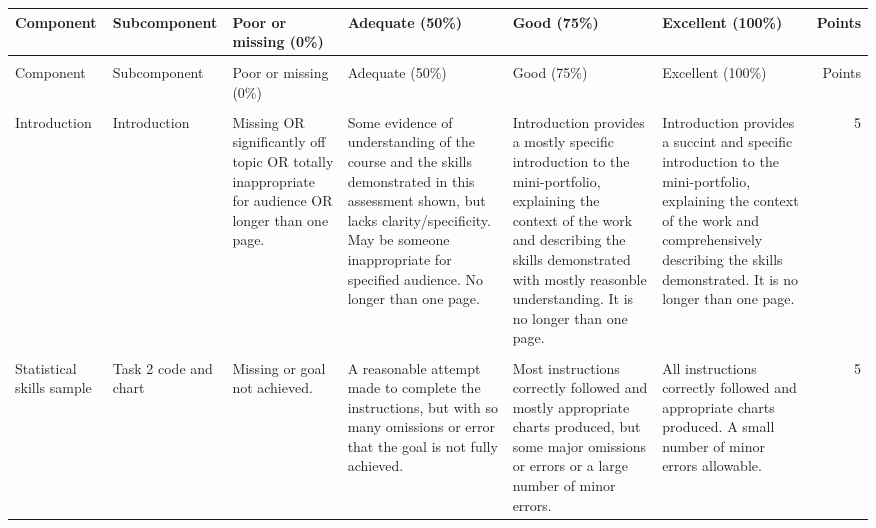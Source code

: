 \documentclass[
  openany]{book}
\begin{document}
\begin{longtable}{>{\raggedright\arraybackslash}p{5em}>{\raggedright\arraybackslash}p{5em}>{\raggedright\arraybackslash}p{10em}>{\raggedright\arraybackslash}p{16em}>{\raggedright\arraybackslash}p{16em}>{\raggedright\arraybackslash}p{16em}r}
\toprule
Component & Subcomponent & Poor or missing (0\%) & Adequate (50\%) & Good (75\%) & Excellent (100\%) & Points\\
\midrule
\endfirsthead
\multicolumn{7}{@{}l}{\textit{(continued)}}\\
\toprule
Component & Subcomponent & Poor or missing (0\%) & Adequate (50\%) & Good (75\%) & Excellent (100\%) & Points\\
\midrule
\endhead

\endfoot
\bottomrule
\endlastfoot
\cellcolor{gray!6}{Cover page} & \cellcolor{gray!6}{Cover page} & \cellcolor{gray!6}{Not all required cover page components are present} & \cellcolor{gray!6}{N/A} & \cellcolor{gray!6}{N/A} & \cellcolor{gray!6}{All required cover page components are present} & \cellcolor{gray!6}{1}\\
Introduction & Introduction & Missing OR significantly off topic OR totally inappropriate for audience OR longer than one page. & Some evidence of understanding of the course and the skills demonstrated in this assessment shown, but lacks clarity/specificity. May be someone inappropriate for specified audience. No longer than one page. & Introduction provides a mostly specific introduction to the mini-portfolio, explaining the context of the work and describing the skills demonstrated with mostly reasonble understanding. It is no longer than one page. & Introduction provides a succint and specific introduction to the mini-portfolio, explaining the context of the work and comprehensively describing the skills demonstrated. It is no longer than one page. & 5\\
\cellcolor{gray!6}{Statistical skills sample} & \cellcolor{gray!6}{Task 1} & \cellcolor{gray!6}{Missing or significant issues with completion of instructions for this task.} & \cellcolor{gray!6}{Correct libraries loaded but several instructions not followed.} & \cellcolor{gray!6}{Correct libraries loaded, but chunk may not be named or printed in the PDF appropriately.} & \cellcolor{gray!6}{Correct libraries loaded without package messages being included in the PDF, and the chunk is named 'setup'. This code chunk  appears in the PDF, under the appropriate heading.} & \cellcolor{gray!6}{1}\\
Statistical skills sample & Task 2 code and chart & Missing or goal not achieved. & A reasonable attempt made to complete the instructions, but with so many omissions or error that the goal is not fully achieved. & Most instructions correctly followed and mostly appropriate charts produced, but some major omissions or errors or a large number of minor errors. & All instructions correctly followed and appropriate charts produced. A small number of minor errors allowable. & 5\\

\end{longtable}
\end{document}
